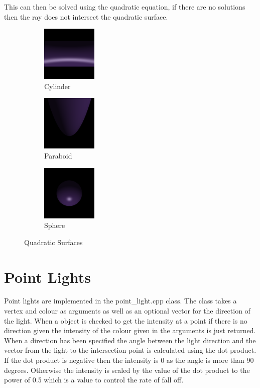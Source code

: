 \documentclass{article}
\begin{document}
This can then be solved using the quadratic equation, if there are no solutions
then the ray does not intersect the quadratic surface.

\begin{figure}[H]
\centering
\begin{subfigure}{.3\textwidth}
  \centering
  \includegraphics[width=100px]{Images/quadCylinder.png}
  \caption{Cylinder}
\end{subfigure}%
\begin{subfigure}{.3\textwidth}
  \centering
  \includegraphics[width=100px]{Images/quadParaboid.png}
  \caption{Paraboid}
\end{subfigure}
\begin{subfigure}{.3\textwidth}
  \centering
  \includegraphics[width=100px]{Images/quadSphere.png}
  \caption{Sphere}
\end{subfigure}
\caption{Quadratic Surfaces}
\label{fig:quadsurface}
\end{figure}

\section{Point Lights}

Point lights are implemented in the point\_light.cpp class. The class takes a vertex
and colour as arguments as well as an optional vector for the direction of the light.
When a object is checked to get the intensity at a point if there is no direction
given the intensity of the colour given in the arguments is just returned.
When a direction has been specified the angle between the light direction and the
vector from the light to the intersection point is calculated using the dot product.
If the dot product is negative then the intensity is 0 as the angle is more than
90 degrees. Otherwise the intensity is scaled by the value of the dot product
to the power of 0.5 which is a value to control the rate of fall off.
\end{document}
